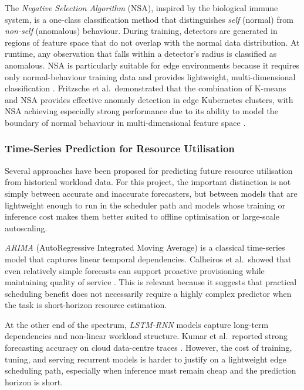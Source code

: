 The \textit{Negative Selection Algorithm} (NSA), inspired by the biological immune system, is a one-class classification method that distinguishes \textit{self} (normal) from \textit{non-self} (anomalous) behaviour. During training, detectors are generated in regions of feature space that do not overlap with the normal data distribution. At runtime, any observation that falls within a detector's radius is classified as anomalous. NSA is particularly suitable for edge environments because it requires only normal-behaviour training data and provides lightweight, multi-dimensional classification \cite{fritzsche2024lightweight}. Fritzsche et al.\ demonstrated that the combination of K-means and NSA provides effective anomaly detection in edge Kubernetes clusters, with NSA achieving especially strong performance due to its ability to model the boundary of normal behaviour in multi-dimensional feature space \cite{fritzsche2024lightweight}.

\subsubsection{Time-Series Prediction for Resource Utilisation}

Several approaches have been proposed for predicting future resource utilisation from historical workload data. For this project, the important distinction is not simply between accurate and inaccurate forecasters, but between models that are lightweight enough to run in the scheduler path and models whose training or inference cost makes them better suited to offline optimisation or large-scale autoscaling.

\textit{ARIMA} (AutoRegressive Integrated Moving Average) is a classical time-series model that captures linear temporal dependencies. Calheiros et al.\ showed that even relatively simple forecasts can support proactive provisioning while maintaining quality of service \cite{calheiros2015arima}. This is relevant because it suggests that practical scheduling benefit does not necessarily require a highly complex predictor when the task is short-horizon resource estimation.

At the other end of the spectrum, \textit{LSTM-RNN} models capture long-term dependencies and non-linear workload structure. Kumar et al.\ reported strong forecasting accuracy on cloud data-centre traces \cite{kumar2017lstm}. However, the cost of training, tuning, and serving recurrent models is harder to justify on a lightweight edge scheduling path, especially when inference must remain cheap and the prediction horizon is short.

